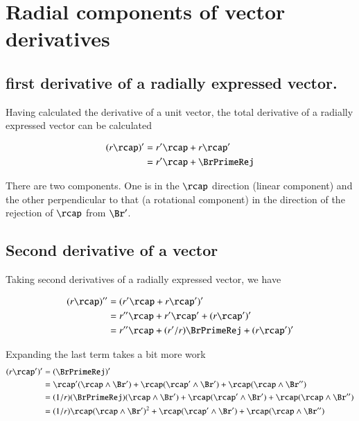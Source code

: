 \chapter{Radial components of vector derivatives}\label{chap:PJRadialDer}
\date{Oct 22, 2007.  radialVectorDerivatives.tex}

\section{first derivative of a radially expressed vector.}

Having calculated the derivative of a unit vector, the total 
derivative of a radially expressed vector can be calculated

\begin{align*}
(r\rcap)'  
   &= r'\rcap  + r\rcap' \\
   &= r'\rcap  + \BrPrimeRej \\
\end{align*}

There are two components.  One is in the $\rcap$ direction (linear component)
and the other perpendicular to that (a rotational component) in the direction of the rejection
of $\rcap$ from $\Br'$.

\section{Second derivative of a vector}

Taking second derivatives of a radially expressed vector, we have

\begin{align*}
(r\rcap)'' 
   &= (r'\rcap + r{\rcap}')' \\
   &= r''\rcap + r'\rcap' + (r\rcap')' \\
   &= r''\rcap + (r'/r)\BrPrimeRej + (r\rcap')' \\
\end{align*}

Expanding the last term takes a bit more work
\begin{align*}
(r\rcap')' 
   &= (\BrPrimeRej)' \\
   &= 
\rcap'(\rcap \wedge \Br') +
\rcap(\rcap' \wedge \Br') +
\rcap(\rcap \wedge \Br'') \\
   &= 
(1/r)(\BrPrimeRej)(\rcap \wedge \Br') +
\rcap(\rcap' \wedge \Br') +
\rcap(\rcap \wedge \Br'') \\
   &= 
(1/r)\rcap(\rcap \wedge \Br')^2 +
\rcap(\rcap' \wedge \Br') +
\rcap(\rcap \wedge \Br'') \\
\end{align*}

